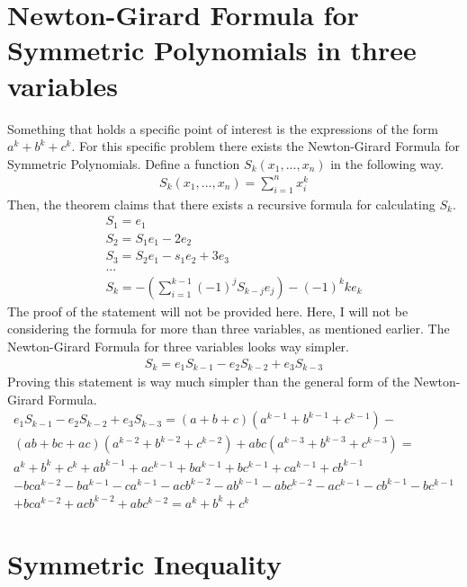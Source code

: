 \documentclass{article}
\begin{document}
\section{Newton-Girard Formula for Symmetric Polynomials in three variables}
Something that holds a specific point of interest is the expressions of the form \(a^k + b^k + c^k\).  For this specific problem there exists the Newton-Girard Formula for Symmetric Polynomials. Define a function \(S_k(x_1, ..., x_n)\) in the following way.
\begin{gather*}
	S_k(x_1, ..., x_n) = \sum_{i=1}^n {x_i^k}
\end{gather*}
Then, the theorem claims that there exists a recursive formula for calculating \(S_k\).
\begin{gather*}
	S_1 = e_1 \\
	S_2 = S_1 e_1 - 2 e_2 \\
	S_3 = S_2 e_1 - s_1 e_2 + 3 e_3 \\
	... \\
	S_k = - \left ( \sum_{i=1}^{k - 1} {(-1)^j S_{k - j} e_j} \right ) - (-1)^k k e_k
\end{gather*}
The proof of the statement will not be provided here. Here, I will not be considering the formula for more than three variables, as mentioned earlier. The Newton-Girard Formula for three variables looks way simpler.
\begin{gather*}
	S_k = e_1 S_{k - 1} - e_2 S_{k - 2} + e_3 S_{k - 3}
\end{gather*}
Proving this statement is way much simpler than the general form of the Newton-Girard Formula.
\begin{multline*}
	e_1 S_{k - 1} - e_2 S_{k - 2} + e_3 S_{k - 3} = (a + b + c)(a^{k - 1} + b^{k - 1} + c^{k - 1}) - \\
	(ab + bc + ac)(a^{k - 2} + b^{k - 2} + c^{k - 2}) + abc(a^{k - 3} + b^{k - 3} + c^{k - 3}) = \\
	a^k + b^k + c^k + ab^{k -1} + ac^{k - 1} + ba^{k - 1} + bc^{k - 1} + ca^{k - 1} + cb^{k - 1} \\
	- b c a^{k - 2} - b a^{k - 1} - c a^{k - 1} - a c b^{k - 2} - a b^{k - 1} - a b c^{k - 2} - a c^{k - 1} - c b^{k - 1} - b c^{k - 1} \\
	+ b c a^{k - 2} + a c b^{k - 2} + a b c^{k - 2} = a^k + b^k + c^k
\end{multline*}

\section{Symmetric Inequality}
\end{document}
